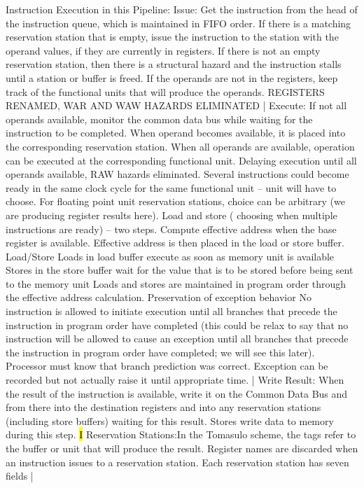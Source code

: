 \documentclass[fontsize=4pt]{scrartcl}
\begin{document}
Instruction Execution in this Pipeline: Issue: Get the instruction from the head of the instruction queue, which is maintained in FIFO order. If there is a matching reservation station that is empty, issue the instruction to the station with the operand values, if they are currently in registers. If there is not an empty reservation station, then there is a structural hazard and the instruction stalls until a station or buffer is freed.  If the operands are not in the registers, keep track of the functional units that will produce the operands. REGISTERS RENAMED, WAR AND WAW HAZARDS ELIMINATED | Execute: If not all operands available, monitor the common data bus while waiting for the instruction to be completed.  When operand becomes available, it is placed into the corresponding reservation station. When all operands are available, operation can be executed at the corresponding functional unit. Delaying execution until all operands available, RAW hazards eliminated. Several instructions could become ready in the same clock cycle for the same functional unit – unit will have to choose. For floating point unit reservation stations, choice can be arbitrary (we are producing register results here). Load and store ( choosing when multiple instructions are ready) – two steps. Compute effective address when the base register is available. Effective address is then placed in the load or store buffer. Load/Store Loads in load buffer execute as soon as memory unit is available
Stores in the store buffer wait for the value that is to be stored before being sent to the memory unit
Loads and stores are maintained in program order through the effective address calculation. Preservation of exception behavior
No instruction is allowed to initiate execution until all branches that precede the instruction in program order have completed (this could be relax to say that no instruction will be allowed to cause an exception until all branches that precede the instruction in program order have completed; we will see this later). Processor must know that branch prediction was correct. Exception can be recorded but not actually raise it until appropriate time. | Write Result: When the result of the instruction is available, write it on the Common Data Bus and from there into the destination registers and into any reservation stations (including store buffers) waiting for this result. Stores write data to memory during this step.
\hl{I}
Reservation Stations:In the Tomasulo scheme, the tags refer to the buffer or unit that will produce the result.   Register names are discarded when an instruction issues to a reservation station. Each reservation station has seven fields |
\end{document}
